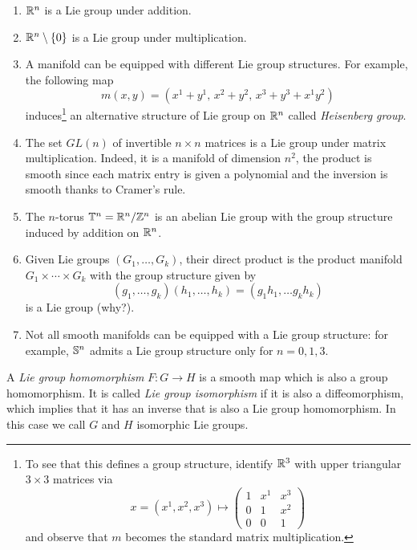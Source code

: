\begin{example}
  \begin{enumerate}
    \item $\mathbb{R}^n$ is a Lie group under addition.
    \item $\mathbb{R}^n\setminus\{0\}$ is a Lie group under multiplication.
    \item A manifold can be equipped with different Lie group structures. For example, the following map
    \begin{equation}
      m(x,y) = (x^1+y^1,\, x^2+y^2,\, x^3+y^3+x^1y^2)
    \end{equation}
    induces\footnote{To see that this defines a group structure, identify $\mathbb{R}^3$ with upper triangular $3\times3$ matrices via
    \begin{equation}\nonumber
      x = (x^1, x^2, x^3) \mapsto \begin{pmatrix}
        1 & x^1 & x^3\\
        0 & 1 & x^2 \\
        0 & 0 & 1
      \end{pmatrix}
    \end{equation}
    and observe that $m$ becomes the standard matrix multiplication.} an alternative structure of Lie group on $\mathbb{R}^n$ called \emph{Heisenberg group}.
    \item The set $GL(n)$ of invertible $n\times n$ matrices is a Lie group under matrix multiplication. Indeed, it is a manifold of dimension $n^2$, the product is smooth since each matrix entry is given a polynomial and the inversion is smooth thanks to Cramer's rule.
    \item The $n$-torus $\mathbb{T}^n = \mathbb{R}^n/\mathbb{Z}^n$ is an abelian Lie group with the group structure induced by addition on $\mathbb{R}^n$.
    \item Given Lie groups $(G_1, \ldots, G_k)$, their direct product is the product manifold $G_1\times \cdots\times G_k$ with the group structure given by
    \begin{equation}
      (g_1, \ldots, g_k)(h_1,\ldots,h_k) = (g_1h_1, \ldots g_kh_k)
    \end{equation}
    is a Lie group (why?).
    \item Not all smooth manifolds can be equipped with a Lie group structure: for example, $\mathbb{S}^n$ admits a Lie group structure only for $n=0,1,3$.
  \end{enumerate}
\end{example}

\begin{definition}
  A \emph{Lie group homomorphism} $F:G\to H$ is a smooth map which is also a group homomorphism. It is called \emph{Lie group isomorphism} if it is also a diffeomorphism, which implies that it has an inverse that is also a Lie group homomorphism. In this case we call $G$ and $H$ isomorphic Lie groups.
\end{definition}

